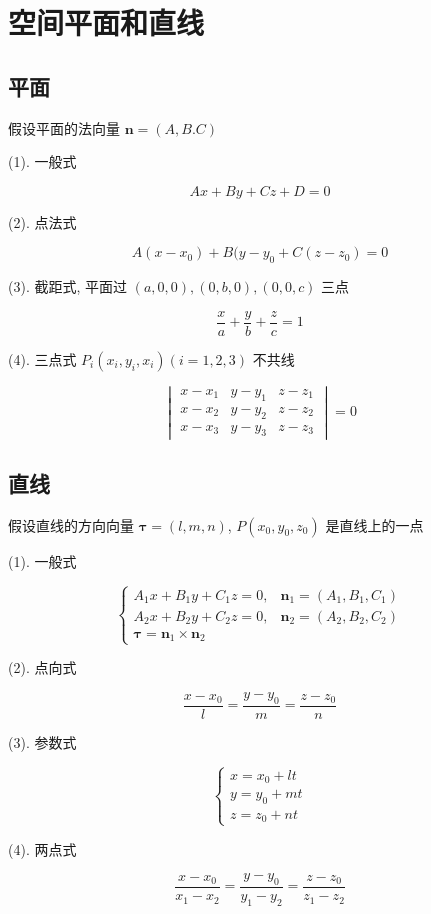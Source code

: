 \section{空间平面和直线}

\subsection{平面}

\begin{definition}[平面方程]
	
	假设平面的法向量 $\boldsymbol{n} = (A, B. C)$

	(1). 一般式
	
	$$Ax+By+Cz+D=0$$

	
	(2). 点法式
	
	$$A(x-x_{0})+B(y-y_{0}+C(z-z_{0})=0$$
	
	(3). 截距式, 平面过 $(a,0,0), (0,b,0), (0,0,c)$ 三点
	
	$$\dfrac{x}{a}+\dfrac{y}{b}+\dfrac{z}{c}=1$$	
	
	(4). 三点式 $P_{i} (x_{i}, y_{i}, x_{i})(i = 1,2,3)$ 不共线  
	
	$$\begin{vmatrix}
		x-x_{1} & y-y_{1} & z-z_{1}\\
		x-x_{2} & y-y_{2} & z-z_{2}\\
		x-x_{3} & y-y_{3} & z-z_{3}
	\end{vmatrix} = 0$$
\end{definition}

\subsection{直线}

\begin{definition}[直线方程]
	
	假设直线的方向向量 $\boldsymbol{\tau} = (l,m,n)$, $P(x_{0},y_{0},z_{0})$ 是直线上的一点

	(1). 一般式
	
	$$\begin{cases}
		A_{1}x+B_{1}y+C_{1}z = 0, & \boldsymbol{n}_{1}=(A_{1},B_{1},C_{1})\\
		A_{2}x+B_{2}y+C_{2}z = 0, & \boldsymbol{n}_{2}=(A_{2},B_{2},C_{2})\\
		\boldsymbol{\tau} = \boldsymbol{n}_{1}\times \boldsymbol{n}_{2} 
	\end{cases}$$
	
	(2). 点向式
	
	$$\dfrac{x-x_{0}}{l}=\dfrac{y-y_{0}}{m}=\dfrac{z-z_{0}}{n}$$
	
	(3). 参数式
	
	$$\begin{cases}
		x = x_{0} + lt\\
		y = y_{0} + mt\\
		z = z_{0} + nt
	\end{cases}$$
	
	(4). 两点式
	
	$$\dfrac{x-x_{0}}{x_{1}-x_{2}}=\dfrac{y-y_{0}}{y_{1}-y_{2}}=\dfrac{z-z_{0}}{z_{1}-z_{2}}$$
\end{definition}

